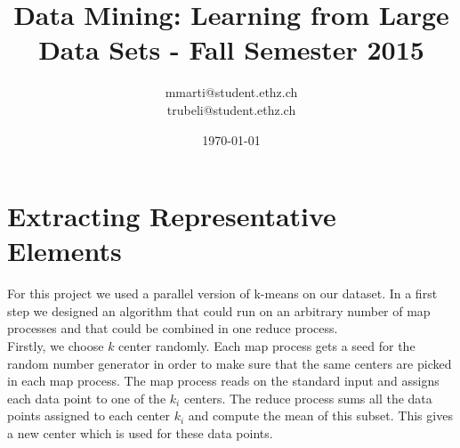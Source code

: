 \documentclass[a4paper, 11pt]{article}
\title{Data Mining: Learning from Large Data Sets - Fall Semester 2015}
\author{mmarti@student.ethz.ch\\ trubeli@student.ethz.ch}
\date{\today}
\begin{document}
\maketitle

\section*{Extracting Representative Elements} 
For this project we used a parallel version of k-means on our dataset. In a first step we designed an algorithm that could run on an arbitrary number of map processes and that could be combined in one reduce process.
\vspace{10pt}
\\Firstly, we choose $k$ center randomly. Each map process gets a seed for the random number generator in order to make sure that the same centers are picked in each map process.
The map process reads on the standard input and assigns each data point to one of the $k_{i}$ centers. The reduce process sums all the data points assigned to each center $k_{i}$ and compute the mean of this subset. This gives a new center which is used for these data points.


 
\end{document}
